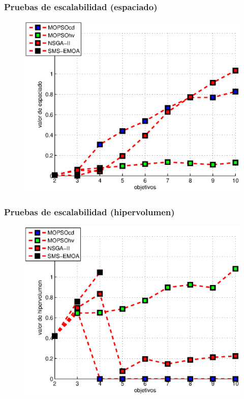 \documentclass[10pt,compress]{beamer}
\begin{document}
\begin{frame}
\frametitle{Pruebas de escalabilidad (espaciado)} 
 \begin{figure}
      \begin{center}
	  \includegraphics[scale=.7]{espaciadoEscala.eps}
      \end{center}
  \end{figure}
\end{frame}
\begin{frame}
\frametitle{Pruebas de escalabilidad (hipervolumen)} 
 \begin{figure}
      \begin{center}
	  \includegraphics[scale=.7]{hipervolumenEscala.eps}
      \end{center}
  \end{figure}
\end{frame}
\end{document}
